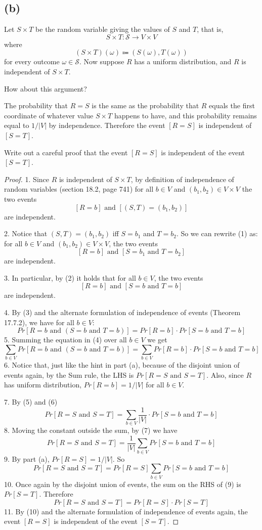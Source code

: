 \documentclass[14pt]{extarticle}
\begin{document}
\subsection{(b)}
Let $S \times T$ be the random variable giving the values of $S$ and $T$, that is, 
$$
S \times T : \mathcal{S} \to V \times V
$$ 
where 
$$
(S \times T)(\omega)  \Coloneqq (S(\omega), T(\omega))
$$ 
for every outcome $\omega \in \mathcal{S}$. Now suppose $R$ has a uniform distribution, and $R$ is independent of $S \times T$. 

How about this argument?

The probability that $R = S$ is the same as the probability that $R$ equals the first coordinate of whatever value $S \times T$ happens to have, and this probability remains equal to $1/|V|$ by indepen­dence. Therefore the event $[R = S]$ is independent of $[S = T]$.

Write out a careful proof that the event $[R = S]$ is independent of the event $[S = T]$.
\begin{proof}
1. Since $R$ is independent of $S \times T$, by definition of independence of random variables (section 18.2, page 741) for all $b \in V$ and $(b_1, b_2) \in V \times V$ the two events
$$
[R = b] \text{ and } [(S, T) = (b_1, b_2)]
$$
are independent.

2. Notice that $(S, T) = (b_1, b_2)$ iff $S = b_1$ and $T = b_2$. So we can rewrite (1) as: for all $b \in V$ and $(b_1, b_2) \in V \times V$, the two events
$$
[R = b] \text{ and } [S = b_1 \text{ and } T = b_2]
$$
are independent.

3. In particular, by (2) it holds that for all $b \in V$, the two events
$$
[R = b] \text{ and } [S = b \text{ and } T = b]
$$
are independent.

4. By (3) and the alternate formulation of independence of events (Theorem 17.7.2), we have for all $b \in V$:
$$
Pr[R = b \text{ and } (S = b \text{ and } T = b)] = Pr[R = b] \cdot Pr[S = b \text{ and } T = b]
$$
5. Summing the equation in (4) over all $b \in V$ we get
$$
\sum_{b \in V}Pr[R = b \text{ and } (S = b \text{ and } T = b)] = \sum_{b \in V}Pr[R = b] \cdot Pr[S = b \text{ and } T = b]
$$
6. Notice that, just like the hint in part (a), because of the disjoint union of events again, by the Sum rule, the LHS is $Pr[R = S \text{ and } S = T]$. Also, since $R$ has uniform distribution, $Pr[R = b] = 1/|V|$ for all $b \in V$.

7. By (5) and (6)
$$
Pr[R = S \text{ and } S = T] = \sum_{b \in V}\frac{1}{|V|} \cdot Pr[S = b \text{ and } T = b]
$$
8. Moving the constant outside the sum, by (7) we have
$$
Pr[R = S \text{ and } S = T] = \frac{1}{|V|}\sum_{b \in V} Pr[S = b \text{ and } T = b]
$$
9. By part (a), $Pr[R = S] = 1 / |V|$. So
$$
Pr[R = S \text{ and } S = T] = Pr[R = S]\sum_{b \in V} Pr[S = b \text{ and } T = b]
$$
10. Once again by the disjoint union of events, the sum on the RHS of (9) is $Pr[S = T]$. Therefore
$$
Pr[R = S \text{ and } S = T] = Pr[R = S]\cdot Pr[S = T]
$$
11. By (10) and the alternate formulation of independence of events again, the event $[R = S]$ is independent of the event $[S = T]$.
\end{proof}
\end{document}
